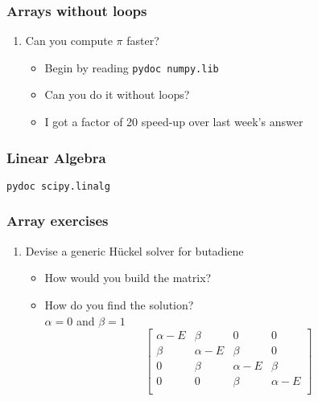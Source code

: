 \documentclass[xcolor=table,10pt,final]{beamer}
\begin{document}
\begin{frame}[fragile]
  \frametitle{Arrays without loops}
  \begin{enumerate}
    \item Can you compute $\pi$ faster?
      \begin{itemize}
        \item Begin by reading {\tt pydoc numpy.lib}
        \item Can you do it without loops?
        \item I got a factor of 20 speed-up over last week's answer
      \end{itemize}
  \end{enumerate}
\end{frame}

\begin{frame}[fragile]
  \frametitle{Linear Algebra}
  {\tt pydoc scipy.linalg}
\end{frame}

\begin{frame}[fragile]
  \frametitle{Array exercises}
  \begin{enumerate}
    \item Devise a generic H\"{u}ckel solver for butadiene
      \begin{itemize}
        \item How would you build the matrix?
        \item How do you find the solution?\\
          $\alpha=0$ and $\beta = 1$\\
          \begin{equation*}
            \begin{bmatrix}
              \alpha - E & \beta & 0 & 0\\
              \beta & \alpha - E & \beta & 0\\
              0 & \beta & \alpha -E & \beta\\
              0 & 0 & \beta & \alpha -E\\
            \end{bmatrix}
          \end{equation*}
      \end{itemize}
  \end{enumerate}
\end{frame}
\end{document}
